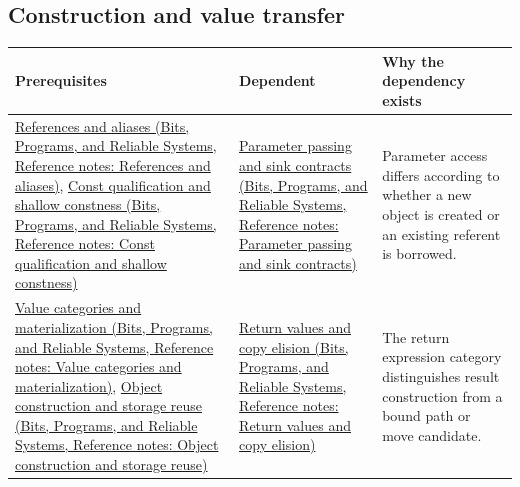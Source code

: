 \subsection{Construction and value transfer}\label{appendix-4ad47bdd269a-construction-and-value-transfer}

\hypertarget{appendix-4ad47bdd269a-construction-and-value-transfer}{}

{\def\LTcaptype{none} %
\begin{longtable}[]{@{}
  >{\raggedright\arraybackslash}p{}
  >{\raggedright\arraybackslash}p{}
  >{\raggedright\arraybackslash}p{}@{}}
\toprule\noalign{}
\begin{minipage}[b]{\linewidth}\raggedright
Prerequisites
\end{minipage} & \begin{minipage}[b]{\linewidth}\raggedright
Dependent
\end{minipage} & \begin{minipage}[b]{\linewidth}\raggedright
Why the dependency exists
\end{minipage} \\
\midrule\noalign{}
\endhead
\bottomrule\noalign{}
\endlastfoot
\href{../01-Bits-Programs-and-Reliable-Systems/main.pdf\#nameddest=appendix-d6d562ca9fbb}{References and aliases (Bits, Programs, and Reliable Systems, Reference notes: References and aliases)}, \href{../01-Bits-Programs-and-Reliable-Systems/main.pdf\#nameddest=appendix-c25d60fed375}{Const qualification and shallow constness (Bits, Programs, and Reliable Systems, Reference notes: Const qualification and shallow constness)} & \href{../01-Bits-Programs-and-Reliable-Systems/main.pdf\#nameddest=appendix-d5908f75721f}{Parameter passing and sink contracts (Bits, Programs, and Reliable Systems, Reference notes: Parameter passing and sink contracts)} & Parameter access differs according to whether a new object is created or an existing referent is borrowed. \\
\href{../01-Bits-Programs-and-Reliable-Systems/main.pdf\#nameddest=appendix-1121b30eaeb0}{Value categories and materialization (Bits, Programs, and Reliable Systems, Reference notes: Value categories and materialization)}, \href{../01-Bits-Programs-and-Reliable-Systems/main.pdf\#nameddest=appendix-a82f9c438857}{Object construction and storage reuse (Bits, Programs, and Reliable Systems, Reference notes: Object construction and storage reuse)} & \href{../01-Bits-Programs-and-Reliable-Systems/main.pdf\#nameddest=appendix-b08d3788c5c6}{Return values and copy elision (Bits, Programs, and Reliable Systems, Reference notes: Return values and copy elision)} & The return expression category distinguishes result construction from a bound path or move candidate. \\

\end{longtable}}
